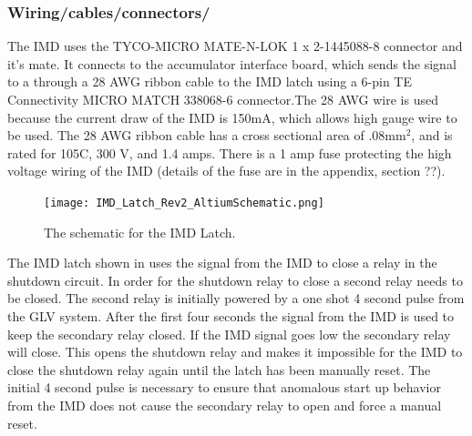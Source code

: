 \documentclass{article}
\begin{document}
\subsubsection{Wiring/cables/connectors/}

The  IMD uses the TYCO-MICRO MATE-N-LOK 1 x 2-1445088-8 connector and it's mate. It connects to the accumulator interface board, which sends the signal to a through a 28 AWG ribbon cable to the IMD latch using a 6-pin TE Connectivity MICRO MATCH 338068-6 connector.The 28 AWG wire is used because the current draw of the IMD is 150mA, which allows high gauge wire to be used. The 28 AWG ribbon cable has a cross sectional area of .08mm$^2$, and is rated for 105\textdegree C, 300 V, and 1.4 amps. There is a 1 amp fuse protecting the high voltage wiring of the IMD (details of the fuse are in the appendix, section ??). %




\begin{figure} [!ht]
	\centering  %
	
	\texttt{[image: IMD\_Latch\_Rev2\_AltiumSchematic.png]}
	
	\caption{The schematic for the IMD Latch.}
	
	\label{fig:IMDLatch_Schematic}
\end{figure}

The IMD latch shown in  uses the signal from the IMD to close a relay in the shutdown circuit. In order for the shutdown relay to close a second relay needs to be closed. The second relay is initially powered by a one shot 4 second pulse from the GLV system. After the first four seconds the signal from the IMD is used to keep the secondary relay closed. If the IMD signal goes low the secondary relay will close. This opens the shutdown relay and makes it impossible for the IMD to close the shutdown relay again until the latch has been manually reset. The initial 4 second pulse is necessary to ensure that anomalous start up behavior from the IMD does not cause the secondary relay to open and force a manual reset.
\end{document}
